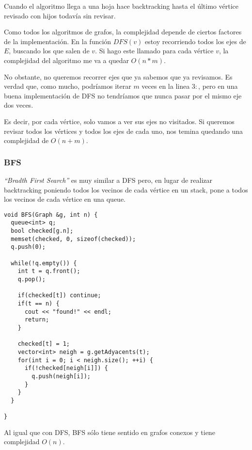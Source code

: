 Cuando el algoritmo llega a una hoja hace backtracking hasta el \'ultimo v\'ertice revisado con hijos todav\'ia sin revisar.

Como todos los algoritmos de grafos, la complejidad depende de ciertos factores de la implementaci\'on. En la funci\'on $DFS(v)$ estoy recorriendo todos los ejes de $E$, buscando los que salen de $v$. Si hago este llamado para cada v\'ertice $v$, la complejidad del algoritmo me va a quedar $O(n * m)$.

No obstante, no queremos recorrer ejes que ya sabemos que ya revisamos. Es verdad que, como mucho, podr\'iamos iterar $m$ veces en la linea $3:$, pero en una buena implementaci\'on de DFS no tendr\'iamos que nunca pasar por el mismo eje dos veces.

Es decir, por cada v\'ertice, solo vamos a ver sus ejes no visitados. Si queremos revisar todos los v\'ertices y todos los ejes de cada uno, nos temina quedando una complejidad de $O(n + m)$.

\newpage
\subsubsection{BFS}

\emph{``Bradth First Search''} es muy similar a DFS pero, en lugar de realizar backtracking poniendo todos los vecinos de cada v\'ertice en un stack, pone a todos los vecinos de cada v\'ertice en una queue.
\vspace{8px}

\begin{center}
\begin{minipage}{0.78\textwidth}
\begin{lstlisting}[frame=lrtb]
void BFS(Graph &g, int n) {
  queue<int> q;
  bool checked[g.n];
  memset(checked, 0, sizeof(checked));
  q.push(0);

  while(!q.empty()) {
    int t = q.front();
    q.pop();

    if(checked[t]) continue;
    if(t == n) {
      cout << "found!" << endl;
      return;
    }

    checked[t] = 1;
    vector<int> neigh = g.getAdyacents(t); 
    for(int i = 0; i < neigh.size(); ++i) {
      if(!checked[neigh[i]]) {
        q.push(neigh[i]);
      }
    }
  }

}
\end{lstlisting}
\end{minipage}
\end{center}

Al igual que con DFS, BFS s\'olo tiene sentido en grafos conexos y tiene complejidad $O(n)$.

